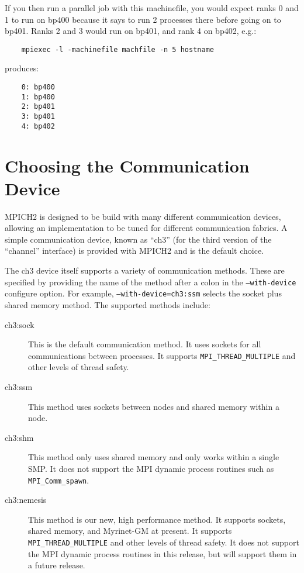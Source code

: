 \documentclass[dvipdfm,11pt]{article}
\begin{document}
If you then run a parallel job with this machinefile, you would expect
ranks 0 and 1 to run on bp400 because it says to run 2 processes there
before going on to bp401.  Ranks 2 and 3 would run on bp401, and rank
4 on bp402, e.g.:

\begin{verbatim}
    mpiexec -l -machinefile machfile -n 5 hostname
\end{verbatim}

produces:
\begin{verbatim}
    0: bp400
    1: bp400
    2: bp401
    3: bp401
    4: bp402
\end{verbatim}

\section{Choosing the Communication Device}
\label{sec:choose-device}

MPICH2 is designed to be build with many different communication devices,
allowing an implementation to be tuned for different communication fabrics.  A
simple communication device, known as ``ch3'' (for the third version of the
``channel'' interface) is provided with MPICH2 and is the default choice.

The ch3 device itself supports a variety of communication methods.  These are
specified by providing the name of the method after a colon in the
\texttt{--with-device} configure option.  For example,
\texttt{--with-device=ch3:ssm} selects the socket plus shared memory method.
The supported methods include:

\begin{description}
\item[ch3:sock]This is the default communication method.  It uses sockets for
  all communications between processes. It supports
  \texttt{MPI\_THREAD\_MULTIPLE} and other levels of thread safety.
\item[ch3:ssm]This method uses sockets between nodes and shared memory within
a node.
\item[ch3:shm]This method only uses shared memory and only works within a
single SMP.  It does not support the MPI dynamic process routines such as
\texttt{MPI\_Comm\_spawn}. 
\item[ch3:nemesis]This method is our new, high performance method.  It
supports sockets, shared memory, and Myrinet-GM at present. It supports
  \texttt{MPI\_THREAD\_MULTIPLE} and other levels of thread safety. It does not
support the MPI dynamic process routines in this release, but will support
them in a future release.
\end{description}
\end{document}
